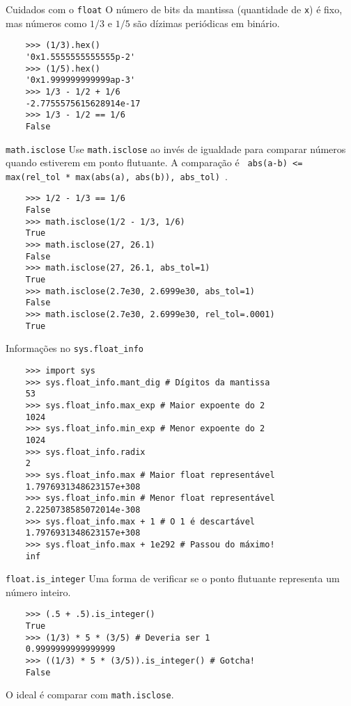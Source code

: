 \documentclass[utf8]{beamer}
\begin{document}
\begin{frame}[fragile]{Cuidados com o \texttt{float}}
  O número de bits da mantissa (quantidade de \texttt{x}) é fixo,
  mas números como $1/3$ e $1/5$ são dízimas periódicas em binário.

  \begin{verbatim}
    >>> (1/3).hex()
    '0x1.5555555555555p-2'
    >>> (1/5).hex()
    '0x1.999999999999ap-3'
    >>> 1/3 - 1/2 + 1/6
    -2.7755575615628914e-17
    >>> 1/3 - 1/2 == 1/6
    False
  \end{verbatim}

\end{frame}


\begin{frame}[fragile]{\texttt{math.isclose}}
  Use \texttt{math.isclose} ao invés de igualdade
  para comparar números quando estiverem em ponto flutuante.
  A comparação é
  \texttt{
    abs(a-b) <= max(rel_tol * max(abs(a), abs(b)), abs_tol)
  }.

  \begin{verbatim}
    >>> 1/2 - 1/3 == 1/6
    False
    >>> math.isclose(1/2 - 1/3, 1/6)
    True
    >>> math.isclose(27, 26.1)
    False
    >>> math.isclose(27, 26.1, abs_tol=1)
    True
    >>> math.isclose(2.7e30, 2.6999e30, abs_tol=1)
    False
    >>> math.isclose(2.7e30, 2.6999e30, rel_tol=.0001)
    True
  \end{verbatim}
\end{frame}


\begin{frame}[fragile]{Informações no \texttt{sys.float\_info}}

  \begin{verbatim}
    >>> import sys
    >>> sys.float_info.mant_dig # Dígitos da mantissa
    53
    >>> sys.float_info.max_exp # Maior expoente do 2
    1024
    >>> sys.float_info.min_exp # Menor expoente do 2
    1024
    >>> sys.float_info.radix
    2
    >>> sys.float_info.max # Maior float representável
    1.7976931348623157e+308
    >>> sys.float_info.min # Menor float representável
    2.2250738585072014e-308
    >>> sys.float_info.max + 1 # O 1 é descartável
    1.7976931348623157e+308
    >>> sys.float_info.max + 1e292 # Passou do máximo!
    inf
  \end{verbatim}

\end{frame}


\begin{frame}[fragile]{\texttt{float.is\_integer}}
  Uma forma de verificar se o ponto flutuante
  representa um número inteiro.

  \begin{verbatim}
    >>> (.5 + .5).is_integer()
    True
    >>> (1/3) * 5 * (3/5) # Deveria ser 1
    0.9999999999999999
    >>> ((1/3) * 5 * (3/5)).is_integer() # Gotcha!
    False
  \end{verbatim}

  O ideal é comparar com \texttt{math.isclose}.
\end{frame}
\end{document}
